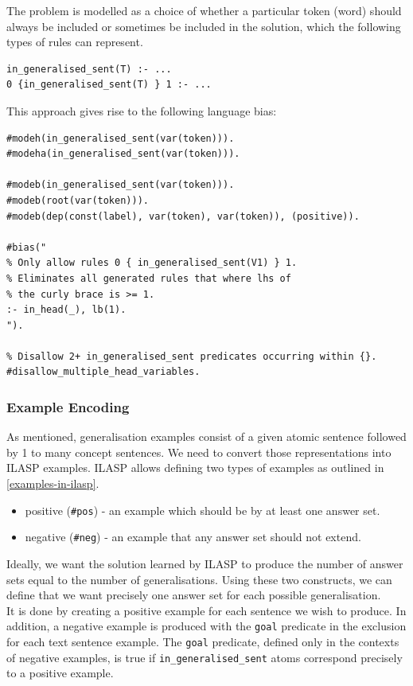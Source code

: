 The problem is modelled as a choice of whether a particular token (word) should always be included or sometimes be included in the solution, which the following types of rules can represent.
\begin{verbatim}
in_generalised_sent(T) :- ...
0 {in_generalised_sent(T) } 1 :- ...
\end{verbatim}

This approach gives rise to the following language bias:
\begin{verbatim}
#modeh(in_generalised_sent(var(token))).
#modeha(in_generalised_sent(var(token))).

#modeb(in_generalised_sent(var(token))).
#modeb(root(var(token))).
#modeb(dep(const(label), var(token), var(token)), (positive)).

#bias("
% Only allow rules 0 { in_generalised_sent(V1) } 1.
% Eliminates all generated rules that where lhs of 
% the curly brace is >= 1.
:- in_head(_), lb(1).
").

% Disallow 2+ in_generalised_sent predicates occurring within {}.
#disallow_multiple_head_variables.

\end{verbatim}

\subsubsection{Example Encoding}
\label{example-encoding}

As mentioned, generalisation examples consist of a given atomic sentence followed by 1 to many concept sentences.
We need to convert those representations into ILASP examples.
ILASP allows defining two types of examples as outlined in \ref{examples-in-ilasp}.
\begin{itemize}
    \item positive (\verb_#pos_) - an example which should be by at least one answer set.
    \item negative (\verb_#neg_) - an example that any answer set should not extend.
\end{itemize}

Ideally, we want the solution learned by ILASP to produce the number of answer sets equal to the number of generalisations.
Using these two constructs, we can define that we want precisely one answer set for each possible generalisation. \\
It is done by creating a positive example for each sentence we wish to produce. 
In addition, a negative example is produced with the \verb_goal_ predicate in the exclusion for each text sentence example.
The \verb_goal_ predicate, defined only in the contexts of negative examples, is true if \verb+in_generalised_sent+ atoms correspond precisely to a positive example.


